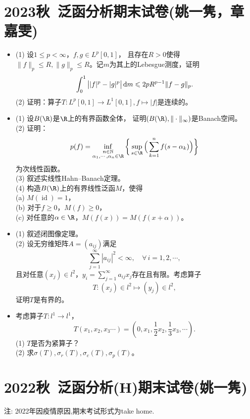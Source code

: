 \section{2023秋\ 泛函分析期末试卷(姚一隽，章嘉雯)}
\begin{itemize}
\item[1.] (1) 设$1\leqslant p<\infty$，$f,g\in L^p[0,1]$，
且存在$R>0$使得$\|f\|_p\leqslant R,\|g\|_p\leqslant R$。记$m$为其上的Lebesgue测度，证明
\[\int_0^1\big||f|^p-|g|^p\big|\,{\rm d}m\leqslant2pR^{p-1}\|f-g\|_p.\]
(2) 证明：算子$T\colon L^p[0,1]\to L^1[0,1],f\mapsto|f|$是连续的。

\item[2.] (1) 设$B(\R)$是$\R$上的有界函数全体，
证明$(B(\R),\|\cdot\|_\infty)$是Banach空间。\\
(2) 证明：\[p(f)=\inf_{\begin{subarray}{c}n\in\mathbb{N}\\\alpha_1,\cdots,\alpha_n\in\R\end{subarray}}
\bigg\{\sup_{s\in\R}\Big(\sum_{k=1}^n f(s-\alpha_k)\Big)\bigg\}\]
为次线性函数。\\
(3) 叙述实线性Hahn--Banach定理。\\
(4) 构造$B(\R)$上的有界线性泛函$M$，使得\\
\quad (a) $M(\operatorname{id})=1$，\\
\quad (b) 对于$f\geqslant0$，$M(f)\geqslant0$，\\
\quad (c) 对任意的$\alpha\in\R$，$M(f(x))=M(f(x+\alpha))$。

\item[3.] (1) 叙述闭图像定理。\\
(2) 设无穷维矩阵$A=(a_{ij})$满足
\[\sum_{j=1}^\infty|a_{ij}|^2<\infty,\quad\forall\,i=1,2,\cdots,\]
且对任意$(x_j)\in l^2$，$\displaystyle y_i=\sum_{j=1}^\infty a_{ij}x_j$存在且有限。考虑算子
\[T\colon(x_j)\in l^2\mapsto(y_j)\in l^2,\]
证明$T$是有界的。

\item[4.] 考虑算子$T\colon l^1\to l^1$，
\[T(x_1,x_2,x_3\cdots)=(0,x_1,\frac12 x_2,\frac13 x_3,\cdots).\]
(1) $T$是否为紧算子？\\
(2) 求$\sigma(T),\sigma_r(T),\sigma_c(T),\sigma_p(T)$。
\end{itemize}

\section{2022秋\ 泛函分析(H)期末试卷(姚一隽)}
注: 2022年因疫情原因,期末考试形式为take home.
